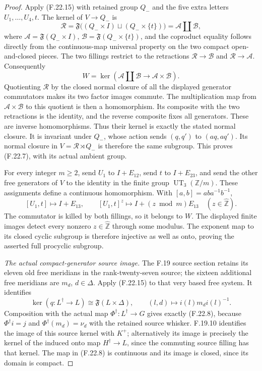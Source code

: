 \begin{proof}
Apply (F.22.15) with retained group $Q_-$
and the five extra letters $U_1,\ldots,U_4,t$.
The kernel of $V\to Q_-$ is
\[
 \mathcal R=
 \mathfrak F\bigl((Q_-\times I)\sqcup(Q_-\times\{t\})\bigr)
       =\mathcal A\amalg\mathcal B,
                                                               \tag{F.22.17}
\]
where $\mathcal A=\mathfrak F(Q_-\times I)$,
$\mathcal B=\mathfrak F(Q_-\times\{t\})$,
and the coproduct equality follows directly
from the continuous-map universal property
on the two compact open-and-closed pieces.
The two fillings restrict to the retractions
$\mathcal R\to\mathcal B$ and
$\mathcal R\to\mathcal A$. Consequently
\[
             W=\ker(\mathcal A\amalg\mathcal B
                            \longrightarrow\mathcal A\times\mathcal B).
                                                               \tag{F.22.18}
\]
Quotienting $\mathcal R$ by the closed normal
closure of all the displayed generator
commutators makes its two factor images
commute. The multiplication map from
$\mathcal A\times\mathcal B$ to this quotient
is then a homomorphism. Its composite with
the two retractions is the identity, and
the reverse composite fixes all generators.
These are inverse homomorphisms. Thus their
kernel is exactly the stated normal closure.
It is invariant under $Q_-$, whose action
sends $(q,q')$ to $(aq,aq')$.
Its normal closure in $V=\mathcal R\rtimes Q_-$
is therefore the same subgroup. This proves
(F.22.7), with its actual ambient group.

For every integer $m\geq2$, send $U_1$ to
$I+E_{12}$, send $t$ to $I+E_{23}$, and send
the other free generators of $V$ to the
identity in the finite group
$\operatorname{UT}_3(\mathbb Z/m)$.
These assignments define a continuous
homomorphism. With $[a,b]=aba^{-1}b^{-1}$,
\[
       [U_1,t]\longmapsto I+E_{13},\qquad
       [U_1,t]^z\longmapsto I+(z\bmod m)E_{13}
                \quad(z\in\widehat{\mathbb Z}).
                                                               \tag{F.22.19}
\]
The commutator is killed by both fillings,
so it belongs to $W$. The displayed finite
images detect every nonzero
$z\in\widehat{\mathbb Z}$ through some modulus.
The exponent map to its closed cyclic
subgroup is therefore injective as well
as onto, proving the asserted full
procyclic subgroup.

\emph{The actual compact-generator source image.}
The F.19 source section retains its eleven
old free meridians in the rank-twenty-seven
source; the sixteen additional free meridians
are $m_d$, $d\in\Delta$. Apply (F.22.15)
to that very based free system. It identifies
\[
 \ker(q:L^\dagger\to L)
       \cong\mathfrak F(L\times\Delta),
       \qquad(l,d)\longmapsto i(l)m_di(l)^{-1}.
                                                               \tag{F.22.20}
\]
Composition with the actual map
$\Phi^\dagger:L^\dagger\to G$ gives exactly
(F.22.8), because $\Phi^\dagger i=j$ and
$\Phi^\dagger(m_d)=\nu_d$ with the retained
source whisker. F.19.10 identifies the image
of this source kernel with $K^+$; alternatively
its image is precisely the kernel of the
induced onto map $H^\dagger\to L$, since
the commuting source filling has that
kernel. The map in (F.22.8) is continuous
and its image is closed, since its domain
is compact.


\end{proof}
